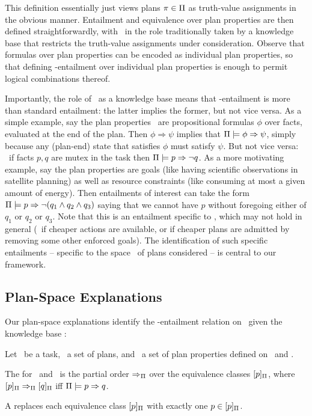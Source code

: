This definition essentially just views plans $\pi \in \Pi$ as
truth-value assignments in the obvious manner. Entailment and
equivalence over plan properties are then defined straightforwardly,
with \plans\ in the role traditionally taken by a knowledge base that
restricts the truth-value assignments under consideration. Observe
that formulas over plan properties can be encoded as individual plan
properties, so that defining \plans-entailment over individual plan
properties is enough to permit logical combinations thereof.

Importantly, the role of \plans\ as a knowledge base means that
\plans-entailment is more than standard entailment: the latter implies
the former, but not vice versa. As a simple example, say the plan
properties \props\ are propositional formulas $\phi$ over facts,
evaluated at the end of the plan. Then $\phi \Rightarrow \psi$ implies
that $\Pi \models \phi \Rightarrow \psi$, simply because any (plan-end)
state that satisfies $\phi$ must satisfy $\psi$. But not vice versa:
\eg\ if facts $p, q$ are mutex in the task then
$\Pi \models p \Rightarrow \neg q$. As a more motivating example, say the
plan properties are goals (like having scientific observations in
satellite planning) as well as resource constraints (like consuming at
most a given amount of energy). Then entailments of interest can take
the form $\Pi \models p \Rightarrow \neg (q_1 \wedge q_2 \wedge q_3)$
saying that we cannot have $p$ without foregoing either of $q_1$ or
$q_2$ or $q_3$. Note that this is an entailment specific to \plans,
which may not hold in general (\eg\ if cheaper actions are available,
or if cheaper plans are admitted by removing some other enforced
goals). The identification of such specific entailments -- specific to
the space \plans\ of plans considered -- is central to our framework.





\subsection{Plan-Space Explanations}

Our plan-space explanations identify the \plans-entailment relation on
\props\ given the knowledge base \plans:

\begin{definition}
Let \task\ be a task, \plans\ a set of plans, and \props\ a set of
plan properties defined on \task\ and \plans.

The  for \plans\ and
\props\ is the partial order $\Rightarrow_{\Pi}$ over the equivalence
classes $[p]_{\Pi}$, where $[p]_{\Pi}
\Rightarrow_{\Pi} [q]_{\Pi}$ iff
$\Pi \models p \Rightarrow q$.

A  replaces each equivalence class
$[p]_{\Pi}$ with exactly one $p \in
[p]_{\Pi}$.
\end{definition}

